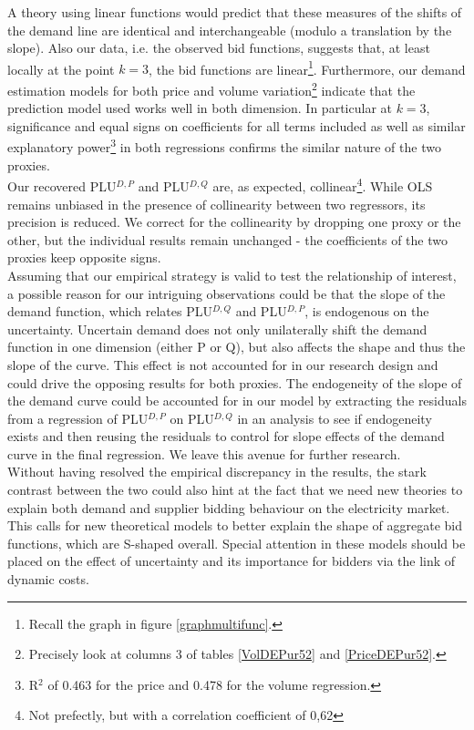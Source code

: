 A theory using linear functions would predict that these measures of the shifts of the demand line are identical and interchangeable (modulo a translation by the slope). Also our data, i.e. the observed bid functions,  suggests that, at least locally at the point $k=3$, the bid functions are linear\footnote{Recall the graph in figure \ref{graphmultifunc}.}. Furthermore, our demand estimation models for both price and volume variation\footnote{Precisely look at columns 3 of tables \ref{VolDEPur52} and \ref{PriceDEPur52}.} indicate that the prediction model used works well in both dimension. In particular at $k=3$, significance and equal signs on coefficients for all terms included as well as similar explanatory power\footnote{R$^2$ of 0.463 for the price  and 0.478 for the volume regression.} in both regressions confirms the similar nature of the two proxies. \\

Our recovered PLU$^{D,P}$ and PLU$^{D,Q}$ are, as expected, collinear\footnote{Not prefectly, but with a correlation coefficient of 0,62}. While OLS remains unbiased in the presence of collinearity between two regressors, its precision is reduced. We correct for the collinearity by dropping one proxy or the other, but the individual results remain unchanged - the coefficients of the two proxies keep opposite signs. \\

Assuming that our empirical strategy is valid to test the relationship of interest, a possible reason for our intriguing observations could be that the slope of the demand function, which relates PLU$^{D,Q}$ and PLU$^{D,P}$, is endogenous on the uncertainty. Uncertain demand does not only unilaterally shift the demand function in one dimension (either P or Q), but also affects the shape and thus the slope of the curve. This effect is not accounted for in our research design and could drive the opposing results for both proxies. The endogeneity of the slope of the demand curve could be accounted for in our model by extracting the residuals from a regression of PLU$^{D,P}$ on PLU$^{D,Q}$ in an analysis to see if endogeneity exists and then reusing the residuals to control for slope effects of the demand curve in the final regression. We leave this  avenue for further research. \\

Without having resolved the empirical discrepancy in the results, the stark contrast between the two could also hint at the fact that we need new theories to explain both demand and supplier bidding behaviour on the electricity market. This calls for new theoretical models to better explain the shape of aggregate bid functions, which are S-shaped overall. Special attention in these models should be placed on the effect of uncertainty and its importance for bidders via the link of dynamic costs. \\

